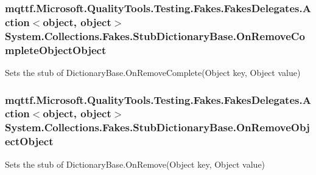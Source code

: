 \hypertarget{class_system_1_1_collections_1_1_fakes_1_1_stub_dictionary_base_a14d7bf593f73e639b6daffd97d985f3d}{
\subsubsection[{On\-Remove\-Complete\-Object\-Object}]{\setlength{\rightskip}{0pt plus 5cm}mqttf.\-Microsoft.\-Quality\-Tools.\-Testing.\-Fakes.\-Fakes\-Delegates.\-Action$<$object, object$>$ System.\-Collections.\-Fakes.\-Stub\-Dictionary\-Base.\-On\-Remove\-Complete\-Object\-Object}}\label{class_system_1_1_collections_1_1_fakes_1_1_stub_dictionary_base_a14d7bf593f73e639b6daffd97d985f3d}


Sets the stub of Dictionary\-Base.\-On\-Remove\-Complete(\-Object key, Object value)

\hypertarget{class_system_1_1_collections_1_1_fakes_1_1_stub_dictionary_base_a91abe75c2a56b5afad31229fb183ce42}{
\subsubsection[{On\-Remove\-Object\-Object}]{\setlength{\rightskip}{0pt plus 5cm}mqttf.\-Microsoft.\-Quality\-Tools.\-Testing.\-Fakes.\-Fakes\-Delegates.\-Action$<$object, object$>$ System.\-Collections.\-Fakes.\-Stub\-Dictionary\-Base.\-On\-Remove\-Object\-Object}}\label{class_system_1_1_collections_1_1_fakes_1_1_stub_dictionary_base_a91abe75c2a56b5afad31229fb183ce42}


Sets the stub of Dictionary\-Base.\-On\-Remove(\-Object key, Object value)

